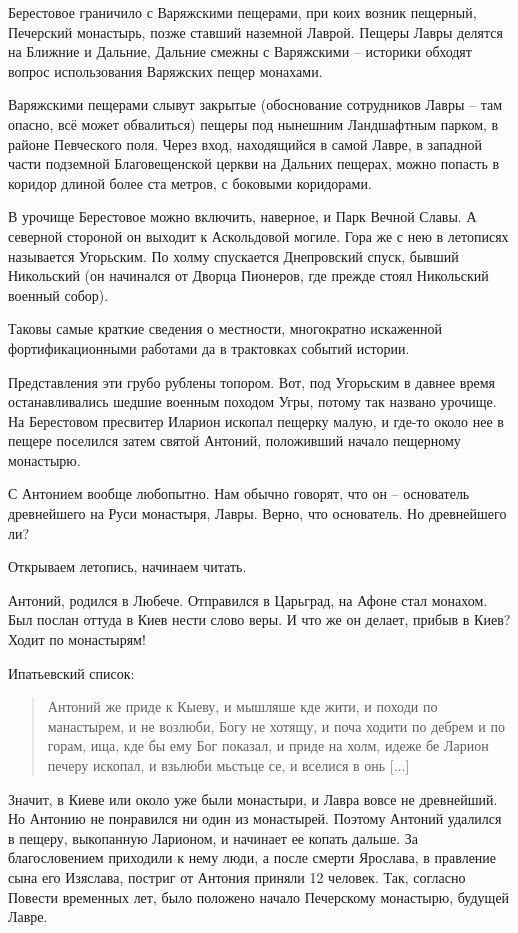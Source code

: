 \documentclass[a5paper,11pt,openany]{article}
\begin{document}
Берестовое граничило с Варяжскими пещерами, при коих возник пещерный, Печерский монастырь, позже ставший наземной Лаврой. Пещеры Лавры делятся на Ближние и Дальние, Дальние смежны с Варяжскими – историки обходят вопрос использования Варяжских пещер монахами.

Варяжскими пещерами слывут закрытые (обоснование сотрудников Лавры – там опасно, всё может обвалиться) пещеры под нынешним Ландшафтным парком, в районе Певческого поля. Через вход, находящийся в самой Лавре, в западной части подземной Благовещенской церкви на Дальних пещерах, можно попасть в коридор длиной более ста метров, с боковыми коридорами.

В урочище Берестовое можно включить, наверное, и Парк Вечной Славы. А северной стороной он выходит к Аскольдовой могиле. Гора же с нею в летописях называется Угорьским. По холму спускается Днепровский спуск, бывший Никольский (он начинался от Дворца Пионеров, где прежде стоял Никольский военный собор).

Таковы самые краткие сведения о местности, многократно искаженной фортификационными работами да в трактовках событий истории.

Представления эти грубо рублены топором. Вот, под Угорьским в давнее время останавливались шедшие военным походом Угры, потому так названо урочище. На Берестовом пресвитер Иларион ископал пещерку малую, и где-то около нее в пещере поселился затем святой Антоний, положивший начало пещерному монастырю. 

С Антонием вообще любопытно. Нам обычно говорят, что он – основатель древнейшего на Руси монастыря, Лавры. Верно, что основатель. Но древнейшего ли? 

Открываем летопись, начинаем читать.

Антоний, родился в Любече. Отправился в Царьград, на Афоне стал монахом. Был послан оттуда в Киев нести слово веры. И что же он делает, прибыв в Киев? Ходит по монастырям!

Ипатьевский список:

\begin{quotation}
\noindent Антоний же приде к Кыеву, и мышляше кде жити, и походи по манастырем, и не возлюби, Богу не хотящу, и поча ходити по дебрем и по горам, ища, кде бы ему Бог показал, и приде на холм, идеже бе Ларион печеру ископал, и взьлюби мьстьце се, и вселися в онь [...]
\end{quotation}

Значит, в Киеве или около уже были монастыри, и Лавра вовсе не древнейший. Но Антонию не понравился ни один из монастырей. Поэтому Антоний удалился в пещеру, выкопанную Ларионом, и начинает ее копать дальше. За благословением приходили к нему люди, а после смерти Ярослава, в правление сына его Изяслава, постриг от Антония приняли 12 человек. Так, согласно Повести временных лет, было положено начало Печерскому монастырю, будущей Лавре.
\end{document}
